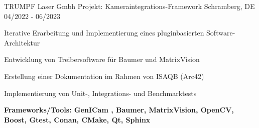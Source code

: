 \cventry
{TRUMPF Laser Gmbh} %
{Projekt:  Kameraintegrations-Framework} %
{Schramberg, DE} %
{04/2022 - 06/2023} %
\begin{cvitems}
	\item{Iterative Erarbeitung und Implementierung eines pluginbasierten Software-Architektur}
	\item{Entwicklung von Treibersoftware für Baumer und MatrixVision}
	\item{Erstellung einer Dokumentation im Rahmen von ISAQB (Arc42)}
	\item{Implementierung von Unit-, Integrations- und Benchmarktests}
	\item{\textbf{Frameworks/Tools: GenICam , Baumer, MatrixVision, OpenCV, Boost, Gtest, Conan, CMake, Qt, Sphinx}}
\end{cvitems}
